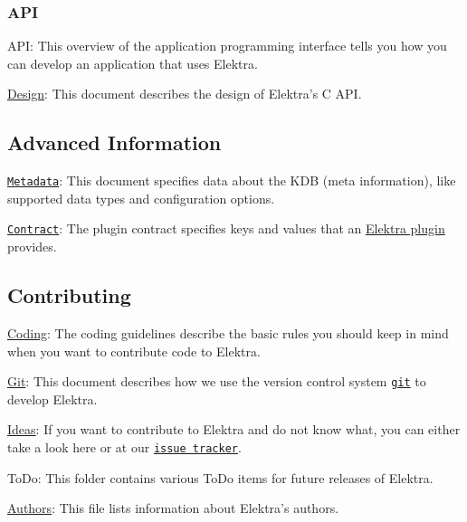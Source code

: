 \subsubsection*{A\+PI}


\begin{DoxyItemize}
\item A\+PI\+: This overview of the application programming interface tells you how you can develop an application that uses Elektra.
\item \hyperlink{doc_DESIGN_md}{Design}\+: This document describes the design of Elektra’s C A\+PI.
\end{DoxyItemize}

\subsection*{Advanced Information}


\begin{DoxyItemize}
\item \href{/home/markus/Projekte/Elektra/current/doc/METADATA.ini}{\tt Metadata}\+: This document specifies data about the K\+DB (meta information), like supported data types and configuration options.
\item \href{/home/markus/Projekte/Elektra/current/doc/CONTRACT.ini}{\tt Contract}\+: The plugin contract specifies keys and values that an \hyperlink{md_src_plugins_README_src_plugins_README_md}{Elektra plugin} provides.
\end{DoxyItemize}

\subsection*{Contributing}


\begin{DoxyItemize}
\item \hyperlink{doc_CODING_md}{Coding}\+: The coding guidelines describe the basic rules you should keep in mind when you want to contribute code to Elektra.
\item \hyperlink{doc_GIT_md}{Git}\+: This document describes how we use the version control system \href{https://git-scm.com}{\tt git} to develop Elektra.
\item \hyperlink{doc_IDEAS_md}{Ideas}\+: If you want to contribute to Elektra and do not know what, you can either take a look here or at our \href{http://libelektra.org/issues}{\tt issue tracker}.
\item To\+Do\+: This folder contains various To\+Do items for future releases of Elektra.
\item \hyperlink{doc_AUTHORS_md}{Authors}\+: This file lists information about Elektra’s authors.
\end{DoxyItemize}

